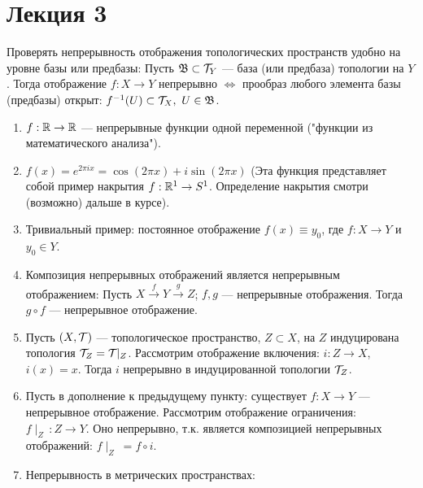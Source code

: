 \section{Лекция 3}


\begin{nota_bene}\label{NB:Sufficient_condition_for_continuity_in_terms_of_base}
    Проверять непрерывность отображения топологических пространств удобно на уровне базы или предбазы:
    Пусть $\mathfrak{B} \subset \mathcal{T}_{Y}$ --- база (или предбаза) топологии на $Y$.
    Тогда отображение $f: X \rightarrow Y$ непрерывно $\Longleftrightarrow$ прообраз любого элемента базы (предбазы) открыт: $f^{-1}(U) \subset \mathcal{T}_{X}, \ U \in \mathfrak{B}$.
\end{nota_bene}

\begin{example} %
    \begin{enumerate}
        \item $f: \mathbb{R} \rightarrow \mathbb{R}$ --- непрерывные функции одной переменной ("функции из математического анализа").
        \item $f(x) = e^{2 \pi i x} = \cos (2\pi x) + i \sin (2\pi x)$ (Эта функция представляет собой пример накрытия $f: \mathbb{R}^1 \rightarrow S^1$. Определение накрытия смотри (возможно) дальше в курсе). %
        \item Тривиальный пример: постоянное отображение $f(x) \equiv  y_0$, где $f: X \rightarrow Y$ и $y_0 \in Y$.
        \item Композиция непрерывных отображений является непрерывным отображением: Пусть $X \overset{f}{\rightarrow} Y \overset{g}{\rightarrow} Z$; $f, g$ --- непрерывные отображения. Тогда $g \circ f$ --- непрерывное отображение.
        \item Пусть $(X, \mathcal{T})$ --- топологическое пространство, $Z \subset X$, на $Z$ индуцирована топология $\mathcal{T}_{Z} = \mathcal{T} \!\! \mid_{Z}$. Рассмотрим отображение включения: $i: Z \rightarrow X$, $i(x) = x$. Тогда $i$ непрерывно в индуцированной топологии $\mathcal{T}_{Z}$.
        \item Пусть в дополнение к предыдущему пункту: существует $f: X \rightarrow Y$ --- непрерывное отображение. Рассмотрим отображение ограничения: $f \! \mid_{Z} \, : Z \rightarrow Y$. Оно непрерывно, т.к. является композицией непрерывных отображений: $f \! \mid_{Z} \ = f \circ i$.
        \item Непрерывность в метрических пространствах:
    \end{enumerate}
\end{example}

